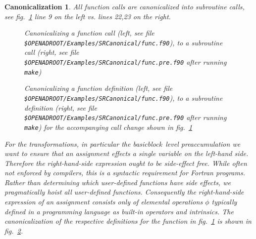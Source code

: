 \documentclass{book}
\newcommand{\basicblock}{basicblock}
\newcommand{\reffig}[1]{{fig.~\ref{#1}}}
\newtheorem{Can}{Canonicalization}
\begin{document}
\begin{Can} \label{can:funcToSub}
  All function calls  
  are canonicalized into subroutine calls, see \reffig{fig:funcToSubCall} line 9 on the left 
vs. lines 22,23 on the right.
\begin{figure}
\begin{minipage}[t]{.48\linewidth}

\end{minipage}
\hspace{.02\linewidth}
\begin{minipage}[t]{.48\linewidth}

\end{minipage}
\caption{Canonicalizing a function call (left, see file 
\lstinline{$OPENADROOT/Examples/SRCanonical/func.f90}), %
to a subroutine call (right,  see file 
\lstinline{$OPENADROOT/Examples/SRCanonical/func.pre.f90} after running \lstinline{make})} %
 \label{fig:funcToSubCall}
  \end{figure}
\begin{figure}
\begin{minipage}[t]{.48\linewidth}

\end{minipage}
\hspace{.02\linewidth}
\begin{minipage}[t]{.48\linewidth}

\end{minipage}
\caption{Canonicalizing a function definition (left, see file 
\lstinline{$OPENADROOT/Examples/SRCanonical/func.f90}), %
to a subroutine definition (right,  see file 
\lstinline{$OPENADROOT/Examples/SRCanonical/func.pre.f90} after running \lstinline{make}) %
for the accompanying call change shown in \reffig{fig:funcToSubCall}} \label{fig:funcToSubDef}
  \end{figure}
  For the transformations, in particular the \basicblock\ level preaccumulation we 
  want to ensure that an assignment effects a single variable on the left-hand side. 
  Therefore  
  the right-hand-side expression ought to be side-effect free.
  While often not enforced by compilers, this is a syntactic requirement for Fortran programs.
  Rather than determining which user-defined functions have side
  effects, we pragmatically hoist \emph{all} user-defined functions.
  Consequently the right-hand-side expression of an assignment consists only of 
  elemental operations $\phi$ typically 
  defined in a programming language as built-in operators and intrinsics.
  The canonicalization of the respective definitions for the function in \reffig{fig:funcToSubCall}
  is  shown in \reffig{fig:funcToSubDef}.
\end{Can}
\end{document}
